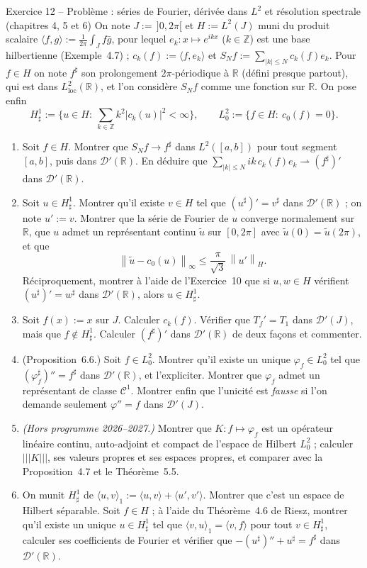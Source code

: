 \documentclass[11pt,a4paper]{article}
\newcommand{\R}{\mathbb{R}}
\newcommand{\Z}{\mathbb{Z}}
\newcommand{\norm}[1]{\left\|#1\right\|}
\newcommand{\opnorm}[1]{|\!|\!|#1|\!|\!|}
\newcommand{\wk}{\rightharpoonup}
\newcommand{\D}{\mathcal{D}}
\theoremstyle{definition}
\begin{document}
\begin{exo}{Exercice 12 -- Problème : séries de Fourier, dérivée dans $L^2$ et résolution spectrale (chapitres 4, 5 et 6)}
On note $J:=\,]0,2\pi[$ et $H:=L^2(J)$ muni du produit scalaire $\langle f,g\rangle:=\frac1{2\pi}\int_Jf\bar g$, pour lequel $e_k:x\mapsto e^{ikx}$ ($k\in\Z$) est une base hilbertienne (Exemple~4.7) ; $c_k(f):=\langle f,e_k\rangle$ et $S_Nf:=\sum_{|k|\le N}c_k(f)e_k$. Pour $f\in H$ on note $f^\sharp$ son prolongement $2\pi$-périodique à $\R$ (défini presque partout), qui est dans $L^2_{\mathrm{loc}}(\R)$, et l'on considère $S_Nf$ comme une fonction sur $\R$. On pose enfin
\[
H^1_\sharp:=\Big\{u\in H:\ \sum_{k\in\Z}k^2|c_k(u)|^2<\infty\Big\},\qquad L^2_0:=\{f\in H:\ c_0(f)=0\}.
\]
\begin{enumerate}[label=(\alph*)]
  \item Soit $f\in H$. Montrer que $S_Nf\to f^\sharp$ dans $L^2([a,b])$ pour tout segment $[a,b]$, puis dans $\D'(\R)$. En déduire que $\sum_{|k|\le N}ik\,c_k(f)e_k\wk(f^\sharp)'$ dans $\D'(\R)$.
  \item Soit $u\in H^1_\sharp$. Montrer qu'il existe $v\in H$ tel que $(u^\sharp)'=v^\sharp$ dans $\D'(\R)$ ; on note $u':=v$. Montrer que la série de Fourier de $u$ converge normalement sur $\R$, que $u$ admet un représentant continu $\tilde u$ sur $[0,2\pi]$ avec $\tilde u(0)=\tilde u(2\pi)$, et que
  \[
  \norm{\tilde u-c_0(u)}_\infty\le\frac\pi{\sqrt3}\,\norm{u'}_H .
  \]
  Réciproquement, montrer à l'aide de l'Exercice~10 que si $u,w\in H$ vérifient $(u^\sharp)'=w^\sharp$ dans $\D'(\R)$, alors $u\in H^1_\sharp$.
  \item Soit $f(x):=x$ sur $J$. Calculer $c_k(f)$. Vérifier que $T_f'=T_1$ dans $\D'(J)$, mais que $f\notin H^1_\sharp$. Calculer $(f^\sharp)'$ dans $\D'(\R)$ de deux façons et commenter.
  \item (Proposition~6.6.) Soit $f\in L^2_0$. Montrer qu'il existe un unique $\varphi_f\in L^2_0$ tel que $(\varphi_f^\sharp)''=f^\sharp$ dans $\D'(\R)$, et l'expliciter. Montrer que $\varphi_f$ admet un représentant de classe $\mathcal C^1$. Montrer enfin que l'unicité est \emph{fausse} si l'on demande seulement $\varphi''=f$ dans $\D'(J)$.
  \item \emph{(Hors programme 2026--2027.)} Montrer que $K:f\mapsto\varphi_f$ est un opérateur linéaire continu, auto-adjoint et compact de l'espace de Hilbert $L^2_0$ ; calculer $\opnorm K$, ses valeurs propres et ses espaces propres, et comparer avec la Proposition~4.7 et le Théorème~5.5.
  \item On munit $H^1_\sharp$ de $\langle u,v\rangle_1:=\langle u,v\rangle+\langle u',v'\rangle$. Montrer que c'est un espace de Hilbert séparable. Soit $f\in H$ ; à l'aide du Théorème~4.6 de Riesz, montrer qu'il existe un unique $u\in H^1_\sharp$ tel que $\langle v,u\rangle_1=\langle v,f\rangle$ pour tout $v\in H^1_\sharp$, calculer ses coefficients de Fourier et vérifier que $-(u^\sharp)''+u^\sharp=f^\sharp$ dans $\D'(\R)$.
\end{enumerate}
\end{exo}
\end{document}
